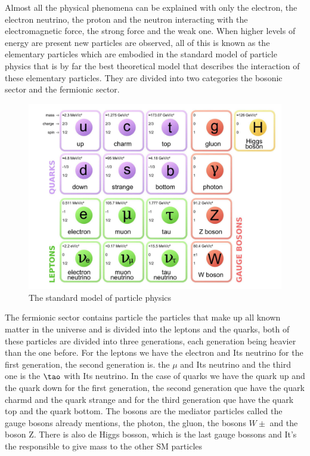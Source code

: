 Almost all the physical phenomena can be explained with only the electron, the electron neutrino, the proton and the neutron interacting with the electromagnetic force, the strong force and the weak one. When higher levels of energy are present new particles are observed, all of this is known as the elementary particles which are embodied in the standard model of particle physics that is by far the best theoretical model that describes the interaction of these elementary particles. They are divided into two categories the bosonic sector and the fermionic sector.  \cite{mppthomson}   


\begin{figure}[h]
    \centering
   \includegraphics[width=1\textwidth]{sm.png}
    \caption{The standard model of particle physics}
    \label{fig:four-forces}
\end{figure}


The fermionic sector contains particle the particles that make up all known matter in the universe and is divided into the leptons and the quarks, both of these particles are divided into three generations, each generation being heavier than the one before. For the leptons we have the electron and Its neutrino for the first generation, the second generation is. the $\mu$ and Its neutrino and the third one is the $\tao$ with Its neutrino. In the case of quarks we have the quark up and the quark down for the first generation, the second generation que have the quark charmd and the quark strange and for the third generation que have the quark top and the quark bottom. The bosons are the mediator particles called the gauge bosons already mentions, the photon, the gluon, the bosons $W\pm$ and the boson Z. There is also de Higgs bosson, which is the last gauge bossons and It's the responsible to give mass to the other SM particles  


